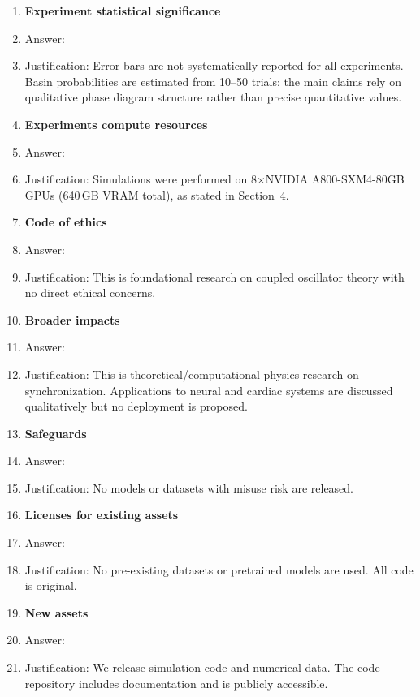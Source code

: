 \begin{enumerate}
\item {\bf Experiment statistical significance}
    \item[] Answer: \answerNo{}
    \item[] Justification: Error bars are not systematically reported for all experiments. Basin probabilities are estimated from 10--50 trials; the main claims rely on qualitative phase diagram structure rather than precise quantitative values.

\item {\bf Experiments compute resources}
    \item[] Answer: \answerYes{}
    \item[] Justification: Simulations were performed on 8$\times$NVIDIA A800-SXM4-80GB GPUs (640\,GB VRAM total), as stated in Section~4.

\item {\bf Code of ethics}
    \item[] Answer: \answerYes{}
    \item[] Justification: This is foundational research on coupled oscillator theory with no direct ethical concerns.

\item {\bf Broader impacts}
    \item[] Answer: \answerNA{}
    \item[] Justification: This is theoretical/computational physics research on synchronization. Applications to neural and cardiac systems are discussed qualitatively but no deployment is proposed.

\item {\bf Safeguards}
    \item[] Answer: \answerNA{}
    \item[] Justification: No models or datasets with misuse risk are released.

\item {\bf Licenses for existing assets}
    \item[] Answer: \answerNA{}
    \item[] Justification: No pre-existing datasets or pretrained models are used. All code is original.

\item {\bf New assets}
    \item[] Answer: \answerYes{}
    \item[] Justification: We release simulation code and numerical data. The code repository includes documentation and is publicly accessible.


\end{enumerate}
